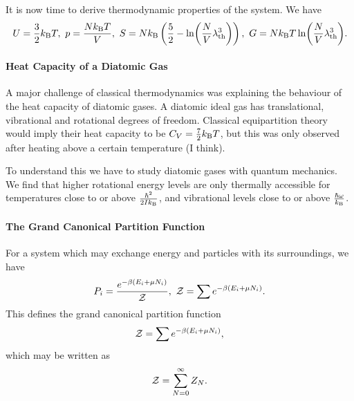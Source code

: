 It is now time to derive thermodynamic properties of the system. We have
\begin{align*}
	U = \frac{3}{2}\kb T,\ p = \frac{N\kb T}{V},\ S = N\kb\left(\frac{5}{2} - \ln(\frac{N}{V}\lambda_{\text{th}}^{3})\right),\ G = N\kb T\ln(\frac{N}{V}\lambda_{\text{th}}^{3}).
\end{align*}

\paragraph{Heat Capacity of a Diatomic Gas}
A major challenge of classical thermodynamics was explaining the behaviour of the heat capacity of diatomic gases. A diatomic ideal gas has translational, vibrational and rotational degrees of freedom. Classical equipartition theory would imply their heat capacity to be $C_{V} = \frac{7}{2}k_{\text{B}} T$, but this was only observed after heating above a certain temperature (I think).

To understand this we have to study diatomic gases with quantum mechanics. We find that higher rotational energy levels are only thermally accessible for temperatures close to or above $\frac{\hbar^{2}}{2Ik_{\text{B}}}$, and vibrational levels close to or above $\frac{\hbar\omega}{k_{\text{B}}}$.

\paragraph{The Grand Canonical Partition Function}
For a system which may exchange energy and particles with its surroundings, we have
\begin{align*}
	P_{i} = \frac{e^{-\beta(E_{i} + \mu N_{i})}}{\mathcal{Z}},\ \mathcal{Z} = \sum e^{-\beta(E_{i} + \mu N_{i})}.
\end{align*}
This defines the grand canonical partition function
\begin{align*}
	\mathcal{Z} = \sum e^{-\beta(E_{i} + \mu N_{i})},
\end{align*}
which may be written as
\begin{align*}
	\mathcal{Z} = \sum\limits_{N = 0}^{\infty}Z_{N}.
\end{align*}

